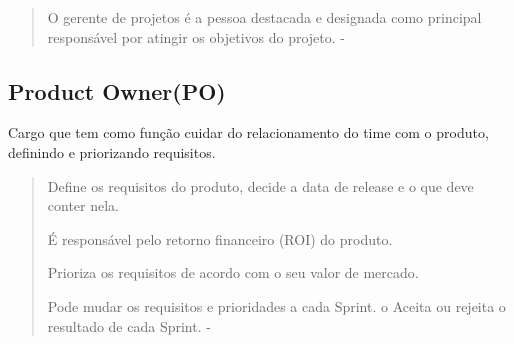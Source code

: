 \begin{quote}
  O gerente de projetos é a pessoa destacada e designada como principal responsável por atingir os objetivos do projeto. - \cite{cruz2013scrum}
\end{quote}
\subsection{Product Owner(PO)}
Cargo que tem como função cuidar do relacionamento do time com o produto,
 definindo e priorizando requisitos.
 
 \begin{quote}
  Define os requisitos do
  produto, decide a data de
  release e o que deve conter
  nela.

  É responsável pelo retorno
  financeiro (ROI) do produto.
  
  Prioriza os requisitos de
  acordo com o seu valor de
  mercado.
  
  Pode mudar os requisitos e
  prioridades a cada Sprint.
  o Aceita ou rejeita o resultado de
  cada Sprint. - \cite{sabbagh2014scrum}
 \end{quote}